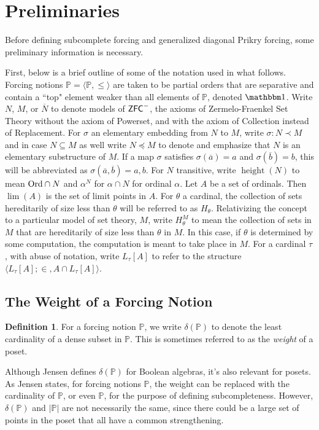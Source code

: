 \documentclass{amsart}
\theoremstyle{definition}
\newtheorem{definition}[theorem]{Definition}
\theoremstyle{remark}
\renewcommand{\P}{\mathbb{P}}
\newcommand{\N}{{\overline{N}}}
\newcommand{\ZFC}{\textup{\ensuremath{\textsf{ZFC}}}}
\newcommand{\Ord}{\textup{\ensuremath{\text{Ord}}}}
\DeclareMathOperator{\height}{height}
\begin{document}
\section{Preliminaries} \label{sec:preliminaries}
Before defining subcomplete forcing and generalized diagonal Prikry forcing, some preliminary information is necessary.

First, below is a brief outline of some of the notation used in what follows.
Forcing notions $\P = \langle \P, \leq \rangle$ are taken to be partial orders that are separative and contain a ``top" element weaker than all elements of $\P$, denoted $\mathbbm 1$.
Write $N$, $M$, or $\N$ to denote models of $\ZFC^-$, the axioms of Zermelo-Fraenkel Set Theory without the axiom of \textsf{Powerset}, and with the axiom of \textsf{Collection} instead of \textsf{Replacement}. For $\sigma$ an elementary embedding from $N$ to $M$, write $\sigma: N \prec M$ and in case $N \subseteq M$ as well write $N \preccurlyeq M$ to denote and emphasize that $N$ is an elementary substructure of $M$. If a map $\sigma$ satisfies $\sigma(\overline a)=a$ and $\sigma(\overline b)=b$, this will be abbreviated as $\sigma(\overline a,\overline b)=a,b$.
For $N$ transitive, write $\height(N)$ to mean $\Ord \cap N$ and $\alpha^N$ for $\alpha \cap N$ for ordinal $\alpha$.
Let $A$ be a set of ordinals. Then $\lim(A)$ is the set of limit points in $A$.  
For $\theta$ a cardinal, the collection of sets hereditarily of size less than $\theta$ will be referred to as $H_\theta$. Relativizing the concept to a particular model of set theory, $M$, write $H_\theta^M$ to mean the collection of sets in $M$ that are hereditarily of size less than $\theta$ in $M$. In this case, if $\theta$ is determined by some computation, the computation is meant to take place in $M$.
For a cardinal $\tau$, with abuse of notation, write $L_\tau[A]$ to refer to the structure $\langle L_\tau[A]; \in, A \cap L_\tau[A] \rangle$. 


\subsection{The Weight of a Forcing Notion}
\label{subsec:delta}

\begin{definition} For a forcing notion $\P$, we write $\delta(\P)$ to denote the least cardinality of a dense subset in $\P$. This is sometimes referred to as the \emph{weight} of a poset. \end{definition}

Although Jensen defines $\delta(\P)$ for Boolean algebras, it's also relevant for posets. As Jensen states, for forcing notions $\P$, the weight can be replaced with the cardinality of $\P$, or even $\P$, for the purpose of defining subcompleteness. However, $\delta(\P)$ and $|\P|$ are not necessarily the same, since there could be a large set of points in the poset that all have a common strengthening. 
\end{document}
